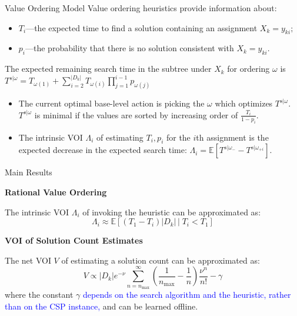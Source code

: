 \documentclass{beamer}
\begin{document}
\begin{frame}{Value Ordering Model}
Value ordering heuristics provide information about:
\begin{itemize}
 \item $T_i$---the expected time to find a solution containing
          an assignment  $X_k=y_{ki};$
\item $p_i$---the probability that there is no solution
  consistent with $X_k=y_{ki}$.
\end{itemize}
The expected remaining search time in the subtree under $X_k$ for
ordering $\omega$ is $T^{s|\omega}=T_{\omega(1)}+\sum_{i=2}^{|D_k|}T_{\omega(i)}\prod_{j=1}^{i-1}p_{\omega(j)}$
\begin{itemize}
\item The current optimal base-level action is picking the $\omega $ which optimizes $T^{s|\omega}$.  $T^{s|\omega}$ is minimal if the values are sorted  by increasing order of $\frac {T_i} {1-p_i}$.
\item The intrinsic VOI $\Lambda_i$ of estimating $T_i, p_i$ for the $i$th assignment is the expected decrease in the expected search time:
          $\Lambda_i=\mathbb{E}\left[T^{s|\omega_-}-T^{s|\omega_{+i}}\right]$.
\end{itemize}
\end{frame}

\begin{frame}{Main Results}

{\large{\bf Rational Value Ordering}}

The intrinsic VOI $\Lambda_i$ of invoking the heuristic can be approximated as:
\[\Lambda_i\approx \mathbb{E}\left[(T_1-T_i)|D_k|\,\Big|\; T_i < T_1 \right]\]

{\large{\bf VOI of Solution Count Estimates}}

The net VOI $V$ of estimating a solution count can be approximated as:
\[V \propto |D_k|e^{-\nu}\sum_{n=n_\mathrm{max}}^\infty \! \! \left( \frac 1 {n_\mathrm{max}} - \frac 1 n\right) \frac {\nu^n} {n!}-\gamma\]
where the constant $\gamma$ \textcolor{blue}{depends on the search algorithm and the heuristic, rather than on the CSP instance,} and can be learned offline. 
\end{frame}
\end{document}
